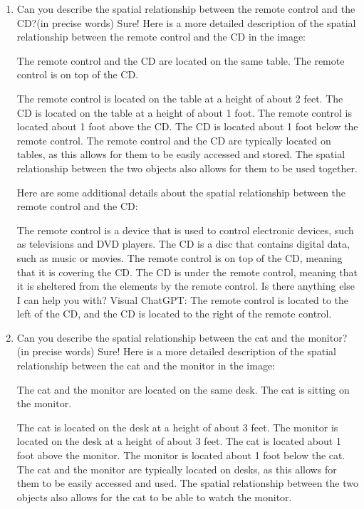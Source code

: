 \begin{enumerate}
    \item Can you describe the spatial relationship between the remote control and the CD?(in precise words)
    \subitem 
    Sure! Here is a more detailed description of the spatial relationship between the remote control and the CD in the image:
    
    The remote control and the CD are located on the same table. The remote control is on top of the CD.
    
    The remote control is located on the table at a height of about 2 feet.
    The CD is located on the table at a height of about 1 foot.
    The remote control is located about 1 foot above the CD.
    The CD is located about 1 foot below the remote control.
    The remote control and the CD are typically located on tables, as this allows for them to be easily accessed and stored. The spatial relationship between the two objects also allows for them to be used together.
    
    Here are some additional details about the spatial relationship between the remote control and the CD:
    
    The remote control is a device that is used to control electronic devices, such as televisions and DVD players.
    The CD is a disc that contains digital data, such as music or movies.
    The remote control is on top of the CD, meaning that it is covering the CD.
    The CD is under the remote control, meaning that it is sheltered from the elements by the remote control.
    Is there anything else I can help you with?
    \subitem Visual ChatGPT: The remote control is located to the left of the CD, and the CD is located to the right of the remote control.
    \item Can you describe the spatial relationship between the cat and the monitor?(in precise words)
    \subitem 
    Sure! Here is a more detailed description of the spatial relationship between the cat and the monitor in the image:
    
    The cat and the monitor are located on the same desk. The cat is sitting on the monitor.
    
    The cat is located on the desk at a height of about 3 feet.
    The monitor is located on the desk at a height of about 3 feet.
    The cat is located about 1 foot above the monitor.
    The monitor is located about 1 foot below the cat.
    The cat and the monitor are typically located on desks, as this allows for them to be easily accessed and used. The spatial relationship between the two objects also allows for the cat to be able to watch the monitor.
    

\end{enumerate}
